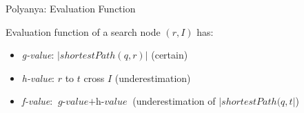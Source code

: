 \begin{frame}{Polyanya: Evaluation Function}
\begin{minipage}{.4\textwidth}
\small Evaluation function of a search node $(r, I)$ has:
\begin{itemize}
    \item \small \textit{g-value}: $|shortestPath(q, r)|$ (certain)
    \item \small \textit{h-value}: $r$ to $t$ cross $I$ (underestimation)
    \item \small \textit{f-value}: $\textit{g-value} + \textit{h-value}$ (underestimation of $|shortestPath(q, t|$)
\end{itemize}
\end{minipage}%
\begin{minipage}{.6\textwidth}
    \begin{adjustbox}{max totalsize={.9\textwidth}{.9\textheight}, right}
    \end{adjustbox}
\end{minipage}
\end{frame}

